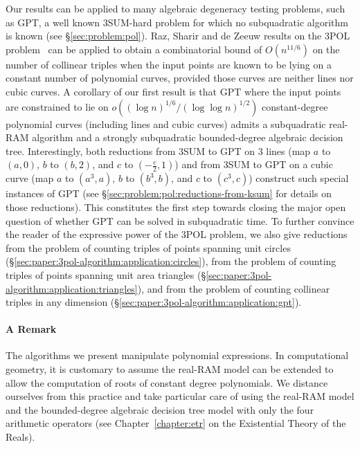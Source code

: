 Our results can be applied to many algebraic degeneracy testing problems, such
as GPT, a well known 3SUM-hard problem for which no subquadratic algorithm is
known (see \S\ref{sec:problem:pol}).
%
Raz, Sharir
and de Zeeuw results on the 3POL problem~\cite{RSZ15} can be applied to obtain
a combinatorial bound of $O(n^{11/6})$ on the
number of collinear triples when the input points are known to be lying on
a constant number of polynomial curves, provided those curves are neither
lines nor cubic curves.
%
A corollary of our first result is that
GPT where the input points are constrained to lie on
$o({(\log n)}^{1/6}/{(\log \log n)}^{1/2})$
constant-degree polynomial curves (including lines and cubic curves)
admits a subquadratic real-RAM algorithm and
a strongly subquadratic bounded-degree algebraic decision tree.
Interestingly, both reductions from 3SUM to GPT on 3 lines (map $a$ to $(a,0)$,
$b$ to $(b,2)$, and $c$ to $(-\frac c2, 1)$) and from 3SUM to GPT on a
cubic curve (map $a$ to $(a^3,a)$, $b$ to $(b^3,b)$, and $c$ to $(c^3,c)$)
construct such special instances of GPT (see
\S\ref{sec:problem:pol:reductions-from-ksum} for details on those reductions).
This constitutes the first step towards closing the major open question of
whether GPT can be solved in subquadratic time.
%
To further convince the reader of the expressive power of the 3POL problem,
we also give reductions
from the problem of counting triples of points spanning
unit circles (\S\ref{sec:paper:3pol-algorithm:application:circles}),
from the problem of counting triples of points spanning unit area
triangles (\S\ref{sec:paper:3pol-algorithm:application:triangles}),
and
from the problem of counting collinear triples in any dimension
(\S\ref{sec:paper:3pol-algorithm:application:gpt}).


\paragraph{A Remark}

The algorithms we present manipulate polynomial expressions.
%
In computational geometry, it is customary to assume the real-RAM model can be
extended to allow the computation of roots of constant degree polynomials.
We distance ourselves from this practice and take particular care
of using the real-RAM model and the bounded-degree algebraic decision tree
model with only the four arithmetic operators (see Chapter~\ref{chapter:etr} on
the Existential Theory of the Reals).
